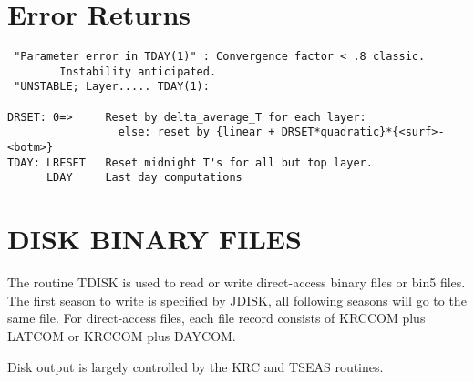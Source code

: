 \documentclass[draft]{article}  %
\begin{document}
\section{Error Returns} %
\vspace{-3.mm} 
\begin{verbatim}
 "Parameter error in TDAY(1)" : Convergence factor < .8 classic. 
        Instability anticipated.  
 "UNSTABLE; Layer..... TDAY(1): 

DRSET: 0=>     Reset by delta_average_T for each layer:
                 else: reset by {linear + DRSET*quadratic}*{<surf>-<botm>}
TDAY: LRESET   Reset midnight T's for all but top layer.
      LDAY     Last day computations
\end{verbatim}


\section{DISK BINARY FILES \label{dbf} } %

The routine TDISK is used to read or write direct-access binary files or bin5
files. The first season to write is specified by JDISK, all following seasons
will go to the same file. For direct-access files, each file record consists of
KRCCOM plus LATCOM or KRCCOM plus DAYCOM.

Disk output is largely controlled by the KRC  and TSEAS routines.
\end{document}
